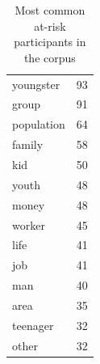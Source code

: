 \begin{table}[htb!]
{\begin{minipage}{.37\textwidth}
\begin{tabularx}{1.0\textwidth}{Xl}
youngster  & 93    \\ 
group      & 91    \\ 
population & 64    \\ 
family     & 58    \\ 
kid        & 50    \\ 
youth      & 48    \\ 
money      & 48    \\ 
worker     & 45    \\ 
life       & 41    \\ 
job        & 41    \\ 
man        & 40    \\ 
area       & 35    \\ 
teenager   & 32    \\ 
other & 32 \\ \bottomrule
\end{tabularx}
\caption{Most common at-risk participants in the corpus}
\label{tab:atrisk}
\end{minipage}}%
\end{table}

